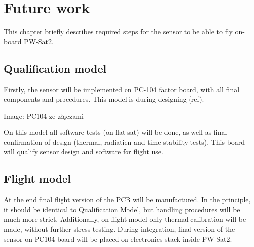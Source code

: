 \chapter{Future work}

This chapter briefly describes required steps for the sensor to be able to fly on-board PW-Sat2.

\section{Qualification model}
    Firstly, the sensor will be implemented on PC-104 factor board, with all final components and procedures. This model is during designing (ref).

    Image: PC104-ze złączami

    On this model all software tests (on flat-sat) will be done, as well as final confirmation of design (thermal, radiation and time-stability tests). This board will qualify sensor design and software for flight use.

\section{Flight model}
    At the end final flight version of the PCB will be manufactured. In the principle, it should be identical to Qualification Model, but handling procedures will be much more strict. Additionally, on flight model only thermal calibration will be made, without further stress-testing. During integration, final version of the sensor on PC104-board will be placed on electronics stack inside PW-Sat2.
